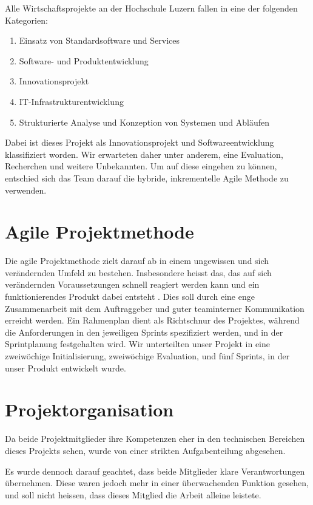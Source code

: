 \documentclass[a4paper]{scrreprt}
\begin{document}
Alle Wirtschaftsprojekte an der Hochschule Luzern fallen in eine der folgenden Kategorien:

\begin{enumerate}
	\item Einsatz von Standardsoftware und Services
	\item Software- und Produktentwicklung
	\item Innovationsprojekt
	\item IT-Infrastrukturentwicklung
	\item Strukturierte Analyse und Konzeption von Systemen und Abläufen
\end{enumerate}

Dabei ist dieses Projekt als Innovationsprojekt und Softwareentwicklung klassifiziert worden. Wir erwarteten daher unter anderem, eine Evaluation, Recherchen und weitere Unbekannten. Um auf diese eingehen zu können, entschied sich das Team darauf die hybride, inkrementelle Agile Methode zu verwenden.

\section{Agile Projektmethode}

Die agile Projektmethode zielt darauf ab in einem ungewissen und sich verändernden Umfeld zu bestehen. Insbesondere heisst das, das auf sich verändernden Voraussetzungen schnell reagiert werden kann und ein funktionierendes Produkt dabei entsteht \parencite{AgileAlliance2015}. Dies soll durch eine enge Zusammenarbeit mit dem Auftraggeber und guter teaminterner Kommunikation erreicht werden.
\bigbreak
Ein Rahmenplan dient als Richtschnur des Projektes, während die Anforderungen in den jeweiligen Sprints spezifiziert werden, und in der Sprintplanung festgehalten wird. Wir unterteilten unser Projekt in eine zweiwöchige Initialisierung, zweiwöchige Evaluation, und fünf Sprints, in der unser Produkt entwickelt wurde.

\section{Projektorganisation}
Da beide Projektmitglieder ihre Kompetenzen eher in den technischen Bereichen dieses Projekts sehen, wurde von einer strikten Aufgabenteilung abgesehen.

Es wurde dennoch darauf geachtet, dass beide Mitglieder klare Verantwortungen übernehmen. Diese waren jedoch mehr in einer überwachenden Funktion gesehen, und soll nicht heissen, dass dieses Mitglied die Arbeit alleine leistete.
\end{document}
